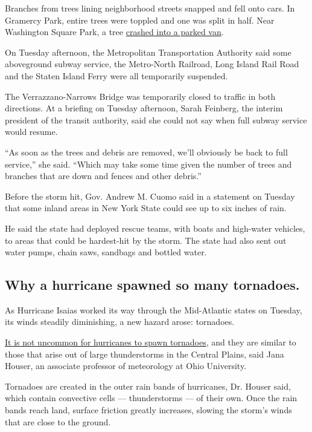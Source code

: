 Branches from trees lining neighborhood streets snapped and fell onto
cars. In Gramercy Park, entire trees were toppled and one was split in
half. Near Washington Square Park, a tree
\href{https://twitter.com/michelledozois/status/1290733797344935936}{crashed
into a parked van}.

On Tuesday afternoon, the Metropolitan Transportation Authority said
some aboveground subway service, the Metro-North Railroad, Long Island
Rail Road and the Staten Island Ferry were all temporarily suspended.

The Verrazzano-Narrows Bridge was temporarily closed to traffic in both
directions. At a briefing on Tuesday afternoon, Sarah Feinberg, the
interim president of the transit authority, said she could not say when
full subway service would resume.

``As soon as the trees and debris are removed, we'll obviously be back
to full service,'' she said. ``Which may take some time given the number
of trees and branches that are down and fences and other debris.''

Before the storm hit, Gov. Andrew M. Cuomo said in a statement on
Tuesday that some inland areas in New York State could see up to six
inches of rain.

He said the state had deployed rescue teams, with boats and high-water
vehicles, to areas that could be hardest-hit by the storm. The state had
also sent out water pumps, chain saws, sandbags and bottled water.

\hypertarget{why-a-hurricane-spawned-so-many-tornadoes}{%
\subsection{Why a hurricane spawned so many
tornadoes.}\label{why-a-hurricane-spawned-so-many-tornadoes}}

As Hurricane Isaias worked its way through the Mid-Atlantic states on
Tuesday, its winds steadily diminishing, a new hazard arose: tornadoes.

\href{https://www.nytimes3xbfgragh.onion/2020/08/04/climate/hurricanes-tornadoes.html}{It
is not uncommon for hurricanes to spawn tornadoes}, and they are similar
to those that arise out of large thunderstorms in the Central Plains,
said Jana Houser, an associate professor of meteorology at Ohio
University.

Tornadoes are created in the outer rain bands of hurricanes, Dr. Houser
said, which contain convective cells --- thunderstorms --- of their own.
Once the rain bands reach land, surface friction greatly increases,
slowing the storm's winds that are close to the ground.

